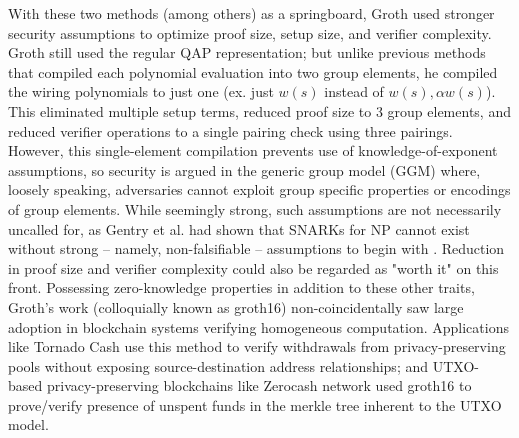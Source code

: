 \noindent With these two methods (among others) as a springboard, Groth \cite{groth16} used stronger security assumptions to optimize proof size, setup size, and verifier complexity. Groth still used the regular QAP representation; but unlike previous methods that compiled each polynomial evaluation into two group elements, he compiled the wiring polynomials to just one (ex. just $w(s)$ instead of $w(s), \alpha w(s)$). This eliminated multiple setup terms, reduced proof size to 3 group elements, and reduced verifier operations to a single pairing check using three pairings. However, this single-element compilation prevents use of knowledge-of-exponent assumptions, so security is argued in the generic group model (GGM) \cite{ggmlower} where, loosely speaking, adversaries cannot exploit group specific properties or encodings of group elements. While seemingly strong, such assumptions are not necessarily uncalled for, as Gentry et al. had shown that SNARKs for NP cannot exist without strong -- namely, non-falsifiable -- assumptions to begin with \cite{nonfalsifiable}. Reduction in proof size and verifier complexity could also be regarded as "worth it" on this front. Possessing zero-knowledge properties in addition to these other traits, Groth's work (colloquially known as groth16) non-coincidentally saw large adoption in blockchain systems verifying homogeneous computation. Applications like Tornado Cash \cite{tornadocash} use this method to verify withdrawals from privacy-preserving pools without exposing source-destination address relationships; and UTXO-based privacy-preserving blockchains like Zerocash network \cite{zcash} used groth16 to prove/verify presence of unspent funds in the merkle tree inherent to the UTXO model. 


